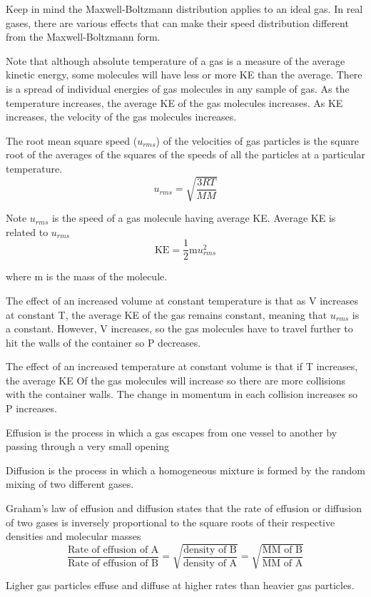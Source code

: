\documentclass[../chem.tex]{subfiles}
\begin{document}
Keep in mind the Maxwell-Boltzmann distribution applies to an ideal gas. In real gases, there are various effects that can make their speed distribution different from the Maxwell-Boltzmann form.

Note that although absolute temperature of a gas is a measure of the average kinetic energy, some molecules will have less or more KE than the average. There is a spread of individual energies 
of gas molecules in any sample of gas. As the temperature increases, the average KE of the gas molecules increases. As KE increases, the velocity of the gas molecules increases.

The root mean square speed ($u_{rms}$) of the velocities of gas particles is the square root of the averages of the squares of the speeds of all the particles at a particular temperature.
\[u_{rms}=\sqrt{\frac{3RT}{MM}}\]

Note $u_{rms}$ is the speed of a gas molecule having average KE. Average KE is related to $u_{rms}$
\[\text{KE}=\frac{1}{2}\text{m}u_{rms}^2\]

where m is the mass of the molecule.

The effect of an increased volume at constant temperature is that as V increases at constant T, the average KE of the gas remains constant, meaning that $u_{rms}$ is a constant.
However, V increases, so the gas molecules have to travel further to hit the walls of the container so P decreases.

The effect of an increased temperature at constant volume is that if T increases, the average KE Of the gas molecules will increase so there are more collisions 
with the container walls. The change in momentum in each collision increases so P increases.

Effusion is the process in which a gas escapes from one vessel to another by passing through a very small opening

Diffusion is the process in which a homogeneous mixture is formed by the random mixing of two different gases.

Graham's law of effusion and diffusion states that the rate of effusion or diffusion of two gases is inversely proportional to the square roots of their respective densities and molecular masses
\[\frac{\text{Rate of effusion of A}}{\text{Rate of effusion of B}}=\sqrt{\frac{\text{density of B}}{\text{density of A}}}=\sqrt{\frac{\text{MM of B}}{\text{MM of A}}}\]

Ligher gas particles effuse and diffuse at higher rates than heavier gas particles.
\end{document}
